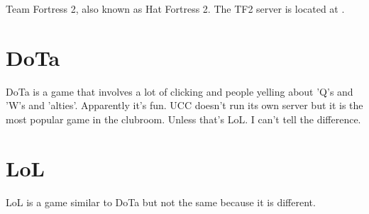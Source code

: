 Team Fortress 2, also known as Hat Fortress 2. The TF2 server is located at .

\section{DoTa}

DoTa is a game that involves a lot of clicking and people yelling about 'Q's and 'W's and 'alties'. Apparently it's fun. UCC doesn't run its own server but it is the most popular game in the clubroom. Unless that's LoL. I can't tell the difference.

\section{LoL}

LoL is a game similar to DoTa but not the same because it is different.
